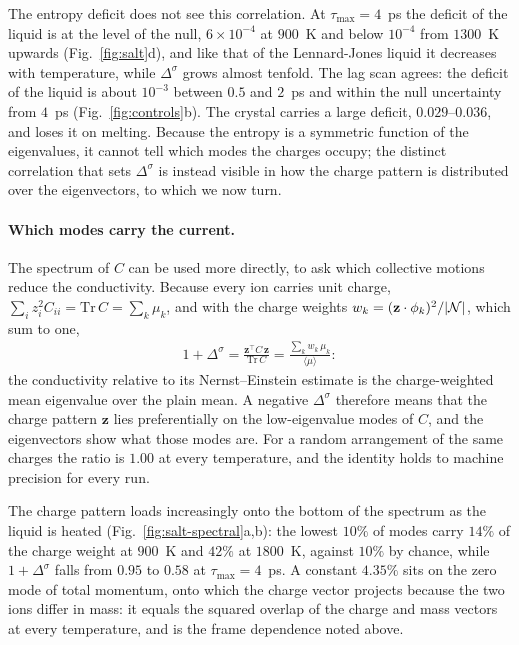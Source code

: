 The entropy deficit does not see this correlation.
At $\tau_{\max} = 4$~ps the deficit of the liquid is at the level of the null, $6 \times 10^{-4}$ at $900$~K and below $10^{-4}$ from $1300$~K upwards (Fig.~\ref{fig:salt}d), and like that of the Lennard-Jones liquid it decreases with temperature, while $\Delta^{\sigma}$ grows almost tenfold.
The lag scan agrees: the deficit of the liquid is about $10^{-3}$ between $0.5$ and $2$~ps and within the null uncertainty from $4$~ps (Fig.~\ref{fig:controls}b).
The crystal carries a large deficit, $0.029$--$0.036$, and loses it on melting.
Because the entropy is a symmetric function of the eigenvalues, it cannot tell which modes the charges occupy; the distinct correlation that sets $\Delta^{\sigma}$ is instead visible in how the charge pattern is distributed over the eigenvectors, to which we now turn.

\paragraph{Which modes carry the current.}
The spectrum of $C$ can be used more directly, to ask which collective motions reduce the conductivity.
Because every ion carries unit charge, $\sum_{i} z_{i}^{2} C_{ii} = \mathrm{Tr}\,C = \sum_{k} \mu_{k}$, and with the charge weights $w_{k} = (\mathbf{z} \cdot \phi_{k})^{2}/|\mathcal{N}|$, which sum to one,
\begin{align}
    1 + \Delta^{\sigma} = \frac{\mathbf{z}^{\top} C\, \mathbf{z}}{\mathrm{Tr}\,C} = \frac{\sum_{k} w_{k}\, \mu_{k}}{\langle \mu \rangle}:
    \label{eqn:spectral-conductivity}
\end{align}
the conductivity relative to its Nernst--Einstein estimate is the charge-weighted mean eigenvalue over the plain mean.
A negative $\Delta^{\sigma}$ therefore means that the charge pattern $\mathbf{z}$ lies preferentially on the low-eigenvalue modes of $C$, and the eigenvectors show what those modes are.
For a random arrangement of the same charges the ratio is $1.00$ at every temperature, and the identity holds to machine precision for every run.

The charge pattern loads increasingly onto the bottom of the spectrum as the liquid is heated (Fig.~\ref{fig:salt-spectral}a,b): the lowest $10\%$ of modes carry $14\%$ of the charge weight at $900$~K and $42\%$ at $1800$~K, against $10\%$ by chance, while $1 + \Delta^{\sigma}$ falls from $0.95$ to $0.58$ at $\tau_{\max} = 4$~ps.
A constant $4.35\%$ sits on the zero mode of total momentum, onto which the charge vector projects because the two ions differ in mass: it equals the squared overlap of the charge and mass vectors at every temperature, and is the frame dependence noted above.

